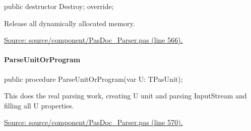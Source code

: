 \documentclass{report}
\newif\ifpdf
\begin{document}
\label{PasDoc_Parser.TParser-Destroy}
\begin{list}{}{
\setlength{\itemindent}{0cm}
\setlength{\listparindent}{0cm}
\setlength{\leftmargin}{\evensidemargin}
\addtolength{\leftmargin}{\tmplength}
\settowidth{\labelsep}{X}
\addtolength{\leftmargin}{\labelsep}
\setlength{\labelwidth}{\tmplength}
}
\item[\textbf{Declaration}\hfill]
\ifpdf
\begin{flushleft}
\fi
\begin{ttfamily}
public destructor Destroy; override;\end{ttfamily}

\ifpdf
\end{flushleft}
\fi

\par
\item[\textbf{Description}]
Release all dynamically allocated memory.\par
\href{https://github.com/pasdoc/pasdoc/blob/master/source/component/PasDoc_Parser.pas#L566}{Source: source/component/PasDoc{\_}Parser.pas (line 566).}

\end{list}
\paragraph*{ParseUnitOrProgram}\hspace*{\fill}

\label{PasDoc_Parser.TParser-ParseUnitOrProgram}
\begin{list}{}{
\setlength{\itemindent}{0cm}
\setlength{\listparindent}{0cm}
\setlength{\leftmargin}{\evensidemargin}
\addtolength{\leftmargin}{\tmplength}
\settowidth{\labelsep}{X}
\addtolength{\leftmargin}{\labelsep}
\setlength{\labelwidth}{\tmplength}
}
\item[\textbf{Declaration}\hfill]
\ifpdf
\begin{flushleft}
\fi
\begin{ttfamily}
public procedure ParseUnitOrProgram(var U: TPasUnit);\end{ttfamily}

\ifpdf
\end{flushleft}
\fi

\par
\item[\textbf{Description}]
This does the real parsing work, creating U unit and parsing InputStream and filling all U properties.\par
\href{https://github.com/pasdoc/pasdoc/blob/master/source/component/PasDoc_Parser.pas#L570}{Source: source/component/PasDoc{\_}Parser.pas (line 570).}

\end{list}
\end{document}
